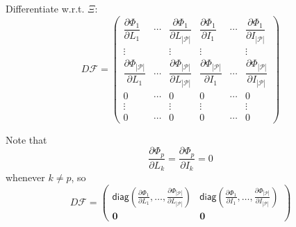 \documentclass[aspectratio=43]{beamer}
\begin{document}
\begin{frame}
Differentiate w.r.t. $\Xi$:
$$
D\mathcal{F}
=
\begin{pmatrix}
\dfrac{\partial\Phi_1}{\partial L_1} & \cdots &
\dfrac{\partial\Phi_1}{\partial L_{|\mathcal{P}|}} & 
\dfrac{\partial\Phi_1}{\partial I_1} & \cdots &
\dfrac{\partial\Phi_1}{\partial I_{|\mathcal{P}|}} \\
\vdots & & \vdots & \vdots & & \vdots \\
\dfrac{\partial\Phi_{|\mathcal{P}|}}{\partial L_1} & \cdots &
\dfrac{\partial\Phi_{|\mathcal{P}|}}{\partial L_{|\mathcal{P}|}} & 
\dfrac{\partial\Phi_{|\mathcal{P}|}}{\partial I_1} & \cdots &
\dfrac{\partial\Phi_{|\mathcal{P}|}}{\partial I_{|\mathcal{P}|}} \\
0 & \cdots & 0 & 0 & \cdots & 0 \\
\vdots & & \vdots & \vdots & & \vdots \\
0 & \cdots & 0 & 0 & \cdots & 0
\end{pmatrix}
$$
\end{frame}

\begin{frame}
Note that
$$
\frac{\partial\Phi_p}{\partial L_k}=\frac{\partial\Phi_p}{\partial I_k}=0
$$
whenever $k\neq p$, so
$$
D\mathcal{F}
=
\begin{pmatrix}
\mathsf{diag}\left(
\frac{\partial\Phi_1}{\partial L_1},\ldots,\frac{\partial\Phi_{|\mathcal{P}|}}{\partial L_{|\mathcal{P}|}}\right) &
\mathsf{diag}\left(
\frac{\partial\Phi_1}{\partial I_1},\ldots,\frac{\partial\Phi_{|\mathcal{P}|}}{\partial I_{|\mathcal{P}|}}\right) \\
\mathbf{0} & \mathbf{0} 
\end{pmatrix}
$$
\end{frame}
\end{document}
